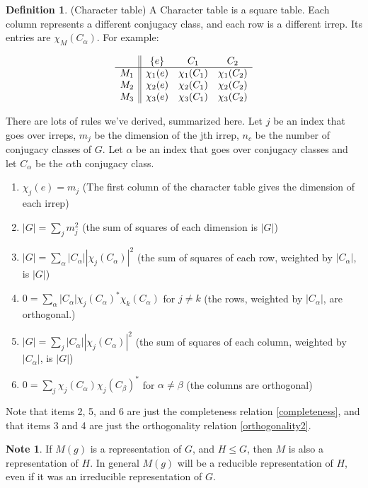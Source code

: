 \documentclass[12pt, letterpaper]{article}
\theoremstyle{definition} %
\newtheorem{defn}[thm]{Definition} %
\newtheorem{note}[thm]{Note}
\begin{document}
\begin{defn} (Character table)
  A Character table is a square table. Each column represents a different conjugacy class, and each row is a different irrep. 
  Its entries are $\chi_M(C_\alpha)$. For example:

\begin{equation*}
 \begin{array}{c || c c c} 
   & \{e\} & C_1 & C_2 \\ 
 \hline
 M_1 & \chi_1(e) & \chi_1(C_1) & \chi_1(C_2) \\ 
 M_2 & \chi_2(e) & \chi_2(C_1) & \chi_2(C_2) \\
 M_3 & \chi_3(e) & \chi_3(C_1) & \chi_3(C_2)  
\end{array}
\end{equation*}

There are lots of rules we've derived, summarized here. 
Let $j$ be an index that goes over irreps, $m_j$ be the dimension of the jth irrep,
  $n_c$ be the number of conjugacy classes of $G$. Let $\alpha$ be an index that goes over conjugacy classes and let $C_\alpha$ be the 
  $\alpha$th conjugacy class.
  \begin{enumerate}
    \item $\chi_j(e)=m_j$ (The first column of the character table gives the dimension of each irrep)
    \item $|G|=\sum_j m_j^2$ (the sum of squares of each dimension is $|G|$)
    \item $|G|=\sum_\alpha |C_\alpha| |\chi_j(C_\alpha)|^2$ (the sum of squares of each row, weighted by $|C_\alpha|$, is $|G|$)
    \item $0=\sum_\alpha |C_\alpha|\chi_j(C_\alpha)^* \chi_k(C_\alpha)$ for $j\neq k$ (the rows, weighted by $|C_\alpha|$, are orthogonal.)
    \item $|G|=\sum_j |C_\alpha| |\chi_j(C_\alpha)|^2$ (the sum of squares of each column, weighted by $|C_\alpha|$, is $|G|$)
    \item $0=\sum_j \chi_j(C_\alpha) \chi_j(C_\beta)^*$ for $\alpha\neq \beta$ (the columns are orthogonal)
  \end{enumerate}

  Note that items 2, 5, and 6 are just the completeness relation \ref{completeness}, and 
  that items 3 and 4 are just the orthogonality relation \ref{orthogonality2}.
\end{defn}

\begin{note}
  If $M(g)$ is a representation of $G$, and $H\leq G$, then $M$ is also a representation of $H$. 
  In general $M(g)$ will be a reducible representation of $H$, even if it was an irreducible representation of $G$. 
\end{note}
\end{document}
